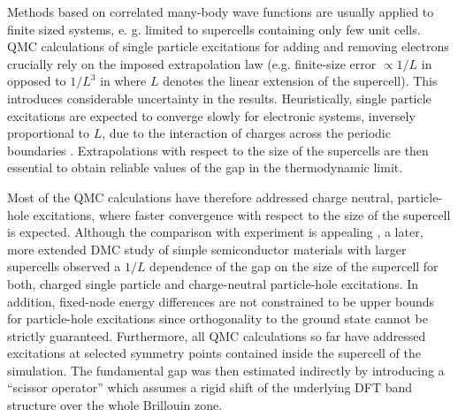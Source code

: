 Methods based on correlated many-body wave functions
are usually applied to finite sized systems, e. g.
limited to supercells containing only few unit cells.
QMC calculations of single particle excitations for adding and removing electrons 
\cite{Kent98,Kent99,Mitra15,McMinis15} crucially rely on the imposed extrapolation law
(e.g. finite-size error $\propto 1/L$ in \cite{McMinis15} opposed to $1/L^3$ in \cite{Mitra15} where $L$ denotes the linear extension of the supercell). This introduces considerable uncertainty in the results.
Heuristically, single particle excitations are expected to converge slowly for electronic systems,
inversely proportional to $L$,
due to the interaction of charges across the periodic boundaries \cite{Payne,Engel}.
Extrapolations with respect to the size of the supercells are then
essential to obtain reliable values of the gap in the thermodynamic limit.

Most of the QMC calculations 
\cite{Ceperley87,Mitas94,Williamson98,Towler2000,Kolorenc08,Ma13,Wagner14,Yu15,Zheng18,Frank19} 
have therefore addressed charge neutral, particle-hole excitations,
where faster convergence with respect to the size of the supercell is expected.
Although the comparison with experiment is appealing \cite{rev3}, 
a later, more extended DMC study \cite{Hunt} of simple semiconductor materials
with larger supercells observed a $1/L$ dependence of the gap on the size of the supercell
for both, charged single particle and charge-neutral particle-hole excitations.
In addition, 
fixed-node energy differences are not constrained to be upper bounds for particle-hole excitations
\cite{Foulkes99} since orthogonality to the ground state cannot be strictly guaranteed.
Furthermore, all QMC calculations so far have addressed excitations at selected
symmetry points contained inside the supercell of the simulation.
The fundamental gap was then estimated indirectly by introducing 
a ``scissor operator'' \cite{Azadi2017} which assumes a rigid shift of
the underlying DFT band structure over the whole Brillouin zone.

